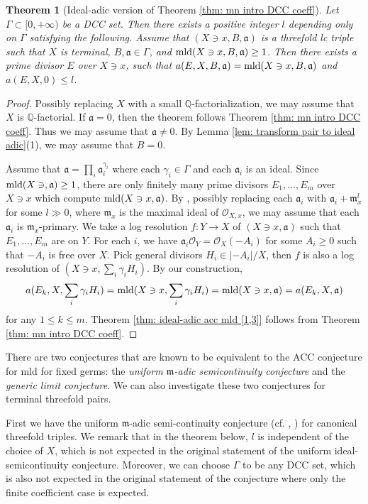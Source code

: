 \documentclass[11pt]{amsart}
\numberwithin{equation}{section}
\newcommand{\Qq}{\mathbb{Q}}
\newcommand{\aaa}{\mathfrak{a}}
\newcommand{\mmm}{\mathfrak{m}}
\newcommand{\mld}{{\rm{mld}}}
\newcommand{\Ii}{{\Gamma}}
\newtheorem{thm}{Theorem}[section]
\theoremstyle{definition}
\theoremstyle{definition}
\begin{document}
\begin{thm}[Ideal-adic version of Theorem \ref{thm: mn intro DCC coeff}]\label{thm: ideal-adic mn DCC coeff}
Let $\Ii\subset [0,+\infty)$ be a DCC set. Then there exists a positive integer $l$ depending only on $\Ii$ satisfying the following. Assume that $(X\ni x,B,\aaa)$ is a threefold lc triple such that $X$ is terminal, $B,\aaa\in\Ii$, and $\mld(X\ni x,B,\aaa)\geq 1$. Then there exists a prime divisor $E$ over $X\ni x$, such that $a(E,X,B,\aaa)=\mld(X\ni x,B,\aaa)$ and $a(E,X,0)\leq l$.
\end{thm}
\begin{proof}
Possibly replacing $X$ with a small $\Qq$-factorialization, we may assume that $X$ is $\Qq$-factorial. If $\aaa=\mathfrak{0}$, then the theorem follows Theorem \ref{thm: mn intro DCC coeff}. Thus we may assume that $\aaa\not=\mathfrak{0}$. By Lemma \ref{lem: transform pair to ideal adic}(1), we may assume that $B=0$. 

Assume that $\aaa=\prod_i\aaa_i^{\gamma_i}$ where each $\gamma_i\in\Ii$ and each $\aaa_i$ is an ideal. Since $\mld(X\ni,\aaa)\geq 1$, there are only finitely many prime divisors $E_1,\dots,E_m$ over $X\ni x$ which compute $\mld(X\ni x,\aaa)$. By \cite[Proposition 2.2 iv]{MN18}, possibly replacing each $\aaa_i$ with $\aaa_i+\mmm_x^l$ for some $l\gg 0$, where $\mmm_x$ is the maximal ideal of $\mathcal{O}_{X,x}$, we may assume that each $\aaa_i$ is $\mmm_x$-primary. We take a log resolution $f: Y\rightarrow X$ of $(X\ni x,\aaa)$ such that $E_1,\dots,E_m$ are on $Y$. For each $i$, we have $\aaa_i\mathcal{O}_Y=\mathcal{O}_X(-A_i)$ for some $A_i\geq 0$ such that $-A_i$ is free over $X$. Pick general divisors $H_i\in|-A_i|/X$, then $f$ is also a log resolution of $(X\ni x,\sum_i\gamma_iH_i)$. By our construction, 
$$a(E_k,X,\sum_i\gamma_iH_i)=\mld(X\ni x,\sum_i\gamma_iH_i)=\mld(X\ni x,\aaa)=a(E_k,X,\aaa)$$
for any $1\leq k\leq m$. Theorem \ref{thm: ideal-adic acc mld [1,3]} follows from Theorem \ref{thm: mn intro DCC coeff}.
\end{proof}

There are two conjectures that are known to be equivalent to the ACC conjecture for mld for fixed germs: the \emph{uniform $\mmm$-adic semicontinuity conjecture} and the \emph{generic limit conjecture}. We can also investigate these two conjectures for terminal threefold pairs.

First we have the uniform $\mmm$-adic semi-continuity conjecture (cf. \cite[Conjecture 7.1]{MN18}, \cite[Conjecture 4.2(iii)]{Kaw21})  for canonical threefold triples. We remark that in the theorem below, $l$ is independent of the choice of $X$, which is not expected in the original statement of the uniform ideal-semicontinuity conjecture. Moreover, we can choose $\Ii$ to be any DCC set, which is also not expected in the original statement of the conjecture where only the finite coefficient case is expected.
\end{document}
